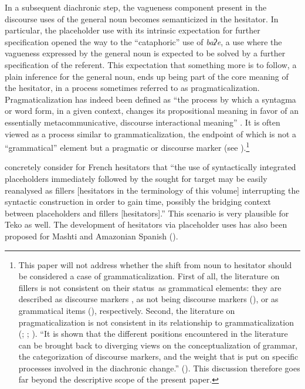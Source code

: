 \documentclass[output=paper]{langscibook}
\begin{document}
In a subsequent diachronic step, the vagueness component present in the discourse uses of the general noun becomes semanticized in the hesitator. In particular, the placeholder use with its intrinsic expectation for further specification opened the way to the “cataphoric” use of \textit{baʔe}, a use where the vagueness expressed by the general noun is expected to be solved by a further specification of the referent. This expectation that something more is to follow, a plain inference for the general noun, ends up being part of the core meaning of the hesitator, in a process sometimes referred to as pragmaticalization. Pragmaticalization has indeed been defined as “the process by which a syntagma or word form, in a given context, changes its propositional meaning in favor of an essentially metacommunicative, discourse interactional meaning” \citep[397]{Frank-Job2006}. It is often viewed as a process similar to grammaticalization, the endpoint of which is not a “grammatical” element but a pragmatic or discourse marker (see \citealt[373]{Diewald2011}).\footnote{This paper will not address whether the shift from noun to hesitator should be considered a case of grammaticalization. First of all, the literature on fillers is not consistent on their status~as grammatical elements: they are described as discourse markers \citep{Podlesskaya2010}, as not being discourse markers (\citealt{VallejosYopán2023}), or as grammatical items (\citealt{Kirjavainen2022}), respectively. Second, the literature on pragmaticalization is not consistent in its relationship to grammaticalization (\citealt{Diewald2011}; \citealt{Heine2013}; \citealt{DegandDegand2015}). “It is shown that the different positions encountered in the literature can be brought back to diverging views on the conceptualization of grammar, the categorization of discourse markers, and the weight that is put on specific processes involved in the diachronic change.” (\citealt[59]{DegandDegand2015}). This discussion therefore goes far beyond the descriptive scope of the present paper.}

\citet[304]{HenneckeHennecke2022} concretely consider for French hesitators that “the use of syntactically integrated placeholders immediately followed by the sought for target may be easily reanalysed as fillers [hesitators in the terminology of this volume]  interrupting the syntactic construction in order to gain time, possibly the bridging context between placeholders and fillers [hesitators].” This scenario is very plausible for Teko as well. The development of hesitators via placeholder uses has also been proposed for Mashti \citep{chapters/rice} and Amazonian Spanish (\citealt{VallejosYopán2023}).
\end{document}
